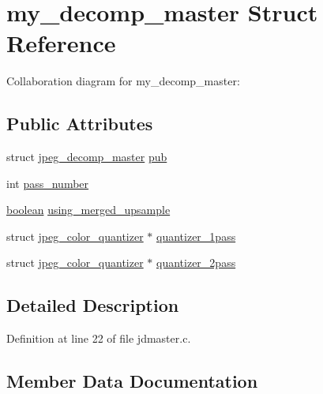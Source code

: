 \hypertarget{structmy__decomp__master}{}\section{my\+\_\+decomp\+\_\+master Struct Reference}
\label{structmy__decomp__master}


Collaboration diagram for my\+\_\+decomp\+\_\+master\+:
\subsection*{Public Attributes}
\begin{DoxyCompactItemize}
\item 
struct \mbox{\hyperlink{structjpeg__decomp__master}{jpeg\+\_\+decomp\+\_\+master}} \mbox{\hyperlink{structmy__decomp__master_ab9a692c30b5f1cc03d9074ad3c69af3f}{pub}}
\item 
int \mbox{\hyperlink{structmy__decomp__master_a0870daa393b92584b4720171586074a1}{pass\+\_\+number}}
\item 
\mbox{\hyperlink{jmorecfg_8h_a7c6368b321bd9acd0149b030bb8275ed}{boolean}} \mbox{\hyperlink{structmy__decomp__master_af7ab207dfbf091b4de60e6fe3938f4a4}{using\+\_\+merged\+\_\+upsample}}
\item 
struct \mbox{\hyperlink{structjpeg__color__quantizer}{jpeg\+\_\+color\+\_\+quantizer}} $\ast$ \mbox{\hyperlink{structmy__decomp__master_af72048ba84933f931c09153470ff4f0b}{quantizer\+\_\+1pass}}
\item 
struct \mbox{\hyperlink{structjpeg__color__quantizer}{jpeg\+\_\+color\+\_\+quantizer}} $\ast$ \mbox{\hyperlink{structmy__decomp__master_a9a5f56ccbaec7d13e08e0cfb9d7a3974}{quantizer\+\_\+2pass}}
\end{DoxyCompactItemize}


\subsection{Detailed Description}


Definition at line 22 of file jdmaster.\+c.



\subsection{Member Data Documentation}
\mbox{\label{structmy__decomp__master_a0870daa393b92584b4720171586074a1}} 
